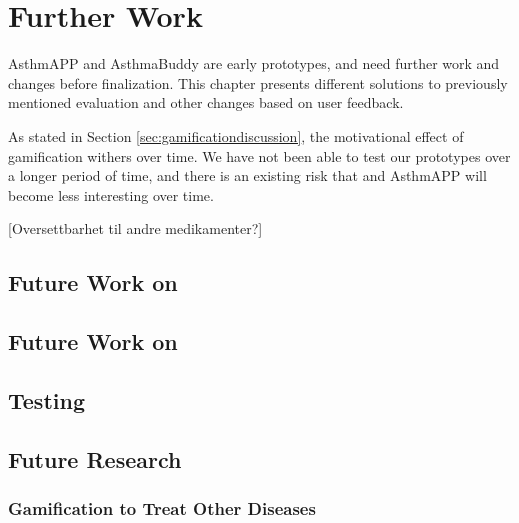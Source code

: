 \chapter{Further Work}
\label{chp:futurework}

AsthmAPP and AsthmaBuddy are early prototypes, and need further work and changes before finalization. This chapter presents different solutions to previously mentioned evaluation and other changes based on user feedback.

As stated in Section \ref{sec:gamificationdiscussion}, the motivational effect of gamification withers over time. We have not been able to test our prototypes over a longer period of time, and there is an existing risk that \buddy{} and AsthmAPP will become less interesting over time. 


[Oversettbarhet til andre medikamenter?]

\section{Future Work on \ab{}}

\section{Future Work on \app{}}

\section{Testing}

\section{Future Research}


\subsection{Gamification to Treat Other Diseases}

